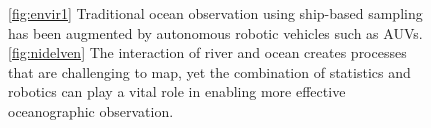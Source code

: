 \documentclass[aoas]{imsart}
\begin{document}
\begin{figure}[!h] 
  \centering 
  \hfill
  \caption{\ref{fig:envir1} Traditional ocean observation using 
    ship-based sampling has been augmented by autonomous
    robotic vehicles such as AUVs. 
    \ref{fig:nidelven} The interaction of river and ocean creates
    processes that are challenging to map, yet the combination of
    statistics and robotics can play a vital role in enabling more
    effective oceanographic observation.}
  \label{fig:envir} \end{figure}
\end{document}
